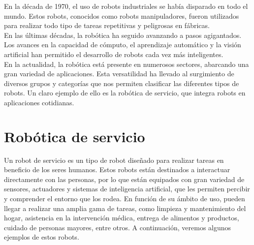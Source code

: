 En la década de 1970, el uso de robots industriales se había disparado en todo el mundo. Estos robots, conocidos como robots manipuladores, fueron utilizados para 
realizar todo tipo de tareas repetitivas y peligrosas en fábricas.
\\
\indent En las últimas décadas, la robótica ha seguido avanzando a pasos agigantados. Los avances en la capacidad de cómputo, el aprendizaje automático y la visión 
artificial han permitido el desarrollo de robots cada vez más inteligentes.
\\

\indent En la actualidad, la robótica está presente en numerosos sectores, abarcando una gran variedad de aplicaciones. Esta versatilidad ha llevado al surgimiento 
de diversos grupos y categorías que nos permiten clasificar las diferentes tipos de robots. Un claro ejemplo de ello es la robótica 
de servicio, que integra robots en aplicaciones cotidianas.

\section{Robótica de servicio}
\noindent Un robot de servicio es un tipo de robot diseñado para realizar tareas en beneficio de los seres humanos. Estos robots están 
destinados a interactuar directamente con las personas, por lo que están equipados con gran variedad de sensores, actuadores y sistemas de 
inteligencia artificial, que les permiten percibir y comprender el entorno que los rodea. 
En función de su ámbito de uso, pueden llegar a realizar una amplia gama de tareas, como limpieza y mantenimiento del hogar, 
asistencia en la intervención médica, entrega de alimentos y productos, cuidado de personas mayores, entre otros. A continuación, 
veremos algunos ejemplos de estos robots.

